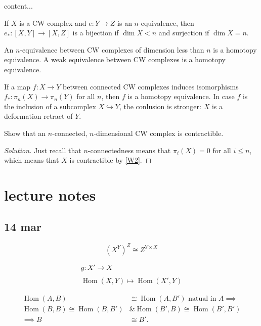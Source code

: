 \documentclass{article}
\numberwithin{equation}{section}
\DeclareMathOperator{\Hom}{Hom}
\begin{document}
\begin{lemma}[HELP]
	content...
\end{lemma}
\begin{thm}
	If $X$ is a CW complex and $e:Y\to Z$ is an $n$-equivalence, then $e_*:[X,Y]\to[X,Z]$ is a bijection if $\dim X<n$ and surjection if $\dim X=n$.
\end{thm}
\begin{thm}\label{thm:W2}
	An $n$-equivalence between CW complexes of dimension less than $n$ is a homotopy equivalence. A weak equivalence between CW complexes is a homotopy equivalence.
\end{thm}
\begin{thm}
	If a map $f:X\to Y$ between connected CW complexes induces isomorphisms $f_*:\pi_n(X)\to\pi_n(Y)$ for all $n$, then $f$ is a homotopy equivalence. In case $f$ is the inclusion of a subcomplex $X\hookrightarrow Y$, the conlusion is stronger: $X$ is a deformation retract of $Y$.
\end{thm}
\begin{exercise}[Hatcher 4.1.12]
	Show that an $n$-connected, $n$-dimensional CW complex is contractible.
\end{exercise}
\begin{proof}[Solution]
	Just recall that $n$-connectedness means that $\pi_i(X)=0$ for all $i\leq n$, which means that $X$ is contractible by \cref{W2}.
\end{proof}
\section{lecture notes}
\subsection{14 mar}

\[(X^Y)^Z\cong Z^{Y\times X}\]

\begin{align*}
	g:X'\to X\\\\
	\Hom(X,Y)\mapsto\Hom(X',Y)
\end{align*}

\begin{align*}
	\Hom(A,B)&\cong\Hom(A,B')\text{ natual in }A\implies\\ \Hom(B,B)\cong\Hom(B,B')&\& \Hom(B',B)\cong\Hom(B',B')\\\implies B&\cong B'.
\end{align*}
\end{document}
